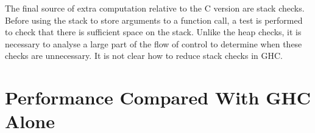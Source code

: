 The final source of extra computation relative to the C version are stack checks. Before using the stack to store arguments to a function call, a test is performed to check that there is sufficient space on the stack. Unlike the heap checks, it is necessary to analyse a large part of the flow of control to determine when these checks are unnecessary. It is not clear how to reduce stack checks in GHC.

\section{Performance Compared With GHC Alone}
\label{sec:haskell_results}

